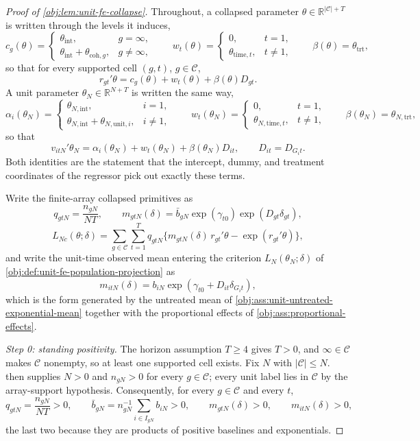 \begin{proof}[Proof of \cref{obj:lem:unit-fe-collapse}]
Throughout, a collapsed parameter \(\theta\in\mathbb R^{|\mathcal C|+T}\) is written through the levels it induces,
\[
c_g(\theta)=
\begin{cases}
\theta_{\text{int}}, & g=\infty,\\
\theta_{\text{int}}+\theta_{\text{coh},g}, & g\neq\infty,
\end{cases}
\qquad
w_t(\theta)=
\begin{cases}
0, & t=1,\\
\theta_{\text{time},t}, & t\neq1,
\end{cases}
\qquad
\beta(\theta)=\theta_{\text{trt}},
\]
so that for every supported cell \((g,t)\), \(g\in\mathcal C\),
\[
r_{gt}'\theta=c_g(\theta)+w_t(\theta)+\beta(\theta)D_{gt}.
\]
A unit parameter \(\theta_N\in\mathbb R^{N+T}\) is written the same way,
\[
\alpha_i(\theta_N)=
\begin{cases}
\theta_{N,\text{int}}, & i=1,\\
\theta_{N,\text{int}}+\theta_{N,\text{unit},i}, & i\neq1,
\end{cases}
\qquad
w_t(\theta_N)=
\begin{cases}
0, & t=1,\\
\theta_{N,\text{time},t}, & t\neq1,
\end{cases}
\qquad
\beta(\theta_N)=\theta_{N,\text{trt}},
\]
so that
\[
v_{itN}'\theta_N=\alpha_i(\theta_N)+w_t(\theta_N)+\beta(\theta_N)D_{it},
\qquad D_{it}=D_{G_it}.
\]
Both identities are the statement that the intercept, dummy, and treatment coordinates of the regressor pick out exactly these terms.

Write the finite-array collapsed primitives as
\[
q_{gtN}=\frac{n_{gN}}{NT},
\qquad
m_{gtN}(\delta)=\bar b_{gN}\exp(\gamma_{t0})\exp(D_{gt}\delta_{gt}),
\]
\[
L_{Nc}(\theta;\delta)
=
\sum_{g\in\mathcal C}\sum_{t=1}^T q_{gtN}\{m_{gtN}(\delta)\,r_{gt}'\theta-\exp(r_{gt}'\theta)\},
\]
and write the unit-time observed mean entering the criterion \(L_N(\theta_N;\delta)\) of \cref{obj:def:unit-fe-population-projection} as
\[
m_{itN}(\delta)=b_{iN}\exp(\gamma_{t0}+D_{it}\delta_{G_it}),
\]
which is the form generated by the untreated mean of \cref{obj:ass:unit-untreated-exponential-mean} together with the proportional effects of \cref{obj:ass:proportional-effects}.

\textit{Step 0: standing positivity.} The horizon assumption \(T\ge4\) gives \(T>0\), and \(\infty\in\mathcal C\) makes \(\mathcal C\) nonempty, so at least one supported cell exists. Fix \(N\) with \(|\mathcal C|\le N\).  then supplies \(N>0\) and \(n_{gN}>0\) for every \(g\in\mathcal C\); every unit label lies in \(\mathcal C\) by the array-support hypothesis. Consequently, for every \(g\in\mathcal C\) and every \(t\),
\[
q_{gtN}=\frac{n_{gN}}{NT}>0,
\qquad
\bar b_{gN}=n_{gN}^{-1}\sum_{i\in I_{gN}}b_{iN}>0,
\qquad
m_{gtN}(\delta)>0,
\qquad
m_{itN}(\delta)>0 ,
\]
the last two because they are products of positive baselines and exponentials.


\end{proof}

